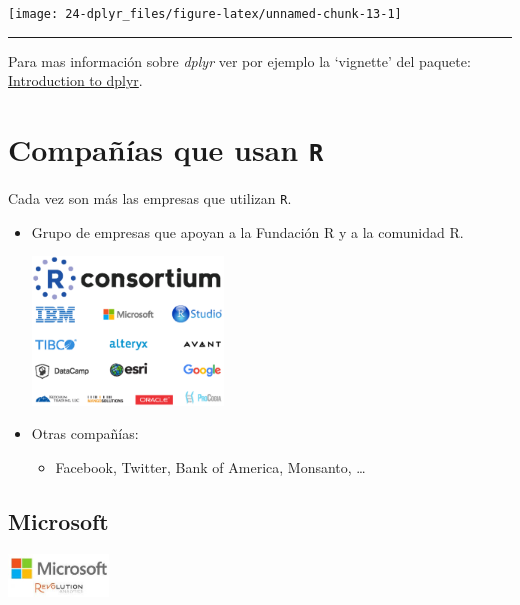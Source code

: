 \documentclass[]{book}
\providecommand{\tightlist}{%
  \setlength{\itemsep}{0pt}\setlength{\parskip}{0pt}}
\begin{document}
\begin{center}\texttt{[image: 24-dplyr\_files/figure-latex/unnamed-chunk-13-1]} \end{center}

\begin{center}\rule{0.5\linewidth}{\linethickness}\end{center}

Para mas información sobre \emph{dplyr} ver por ejemplo la `vignette' del paquete:\\
\href{http://cran.rstudio.com/web/packages/dplyr/vignettes/introduction.html}{Introduction to dplyr}.

\hypertarget{companias-que-usan-r}{%
\chapter{\texorpdfstring{Compañías que usan \texttt{R}}{Compañías que usan R}}\label{companias-que-usan-r}}

Cada vez son más las empresas que utilizan \texttt{R}.

\begin{itemize}
\item
  Grupo de empresas que apoyan a la Fundación R y a la comunidad R.

  \includegraphics[width=0.4\textwidth,height=\textheight]{figuras/rconsortium2.png}
\item
  Otras compañías:

  \begin{itemize}
  \tightlist
  \item
    Facebook, Twitter, Bank of America, Monsanto, \ldots{}
  \end{itemize}
\end{itemize}

\hypertarget{microsoft}{%
\section{Microsoft}\label{microsoft}}

\includegraphics[width=0.2\textwidth,height=\textheight]{figuras/Revolution.jpeg}
\end{document}
